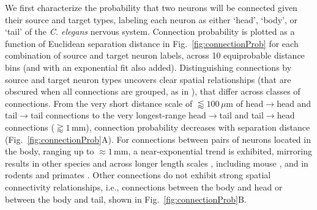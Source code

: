 \documentclass[10pt,letterpaper]{article}
\begin{document}
We first characterize the probability that two neurons will be connected given their source and target types, labeling each neuron as either `head', `body', or `tail' of the \emph{C. elegans} nervous system.
Connection probability is plotted as a function of Euclidean separation distance in Fig.~\ref{fig:connectionProb} for each combination of source and target neuron labels, across 10 equiprobable distance bins (and with an exponential fit also added).
Distinguishing connections by source and target neuron types uncovers clear spatial relationships (that are obscured when all connections are grouped, as in \cite{Azulay:2016cg}), that differ across classes of connections.
From the very short distance scale of $\lessapprox 100\,\mu$m of head$\rightarrow$head and tail$\rightarrow$tail connections to the very longest-range head$\rightarrow$tail and tail$\rightarrow$head connections ($\gtrapprox 1\,$mm), connection probability decreases with separation distance (Fig.~\ref{fig:connectionProb}A).
For connections between pairs of neurons located in the body, ranging up to $\approx 1$\,mm, a near-exponential trend is exhibited, mirroring results in other species and across longer length scales \cite{Wang:2016gg}, including mouse \cite{Goulas:2016hr, Fulcher:2016ck}, and in rodents and primates \cite{Horvat:2016ia}.
Other connections do not exhibit strong spatial connectivity relationships, i.e., connections between the body and head or between the body and tail, shown in Fig.~\ref{fig:connectionProb}B.
\end{document}
